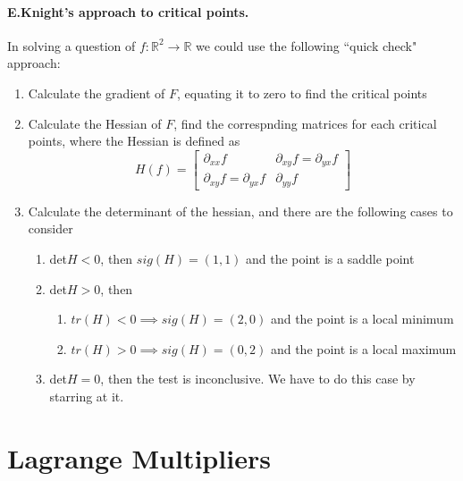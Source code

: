 \documentclass[11pt]{article}
\newcommand{\real}[0]{\mathbb{R}}
\begin{document}
\paragraph{E.Knight's approach to critical points.}In solving a question of $f:\real^2 \rightarrow{} \real$ we could use the following ``quick check" approach:
\begin{enumerate}
    \item Calculate the gradient of $F$, equating it to zero to find the critical points
    \item Calculate the Hessian of $F$, find the correspnding matrices for each critical points, where the Hessian is defined as
    \begin{equation*} H(f) = 
        \begin{bmatrix}
             \partial_{xx}f & \partial_{xy}f = \partial_{yx}f \\
             \partial_{xy}f = \partial_{yx}f & \partial_{yy}f
        \end{bmatrix}
    \end{equation*}
    \item Calculate the determinant of the hessian, and there are the following cases to consider
    \begin{enumerate}
        \item det$H<0$, then $sig(H) = (1,1)$ and the point is a saddle point
        \item det$H>0$, then
            \begin{enumerate}
                \item $tr(H)<0 \implies sig(H) = (2,0)$ and the point is a local minimum
                \item $tr(H)>0 \implies sig(H) = (0,2)$ and the point is a local maximum
            \end{enumerate}
        \item det$H=0$, then the test is inconclusive. We have to do this case by starring at it.
    \end{enumerate}
\end{enumerate}
\section{Lagrange Multipliers}
\end{document}
